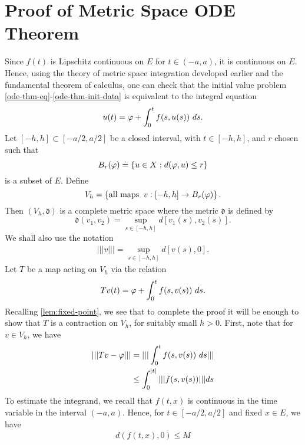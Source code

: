 \section{Proof of Metric Space ODE Theorem}
	Since $f(t)$ is Lipschitz continuous on $E$ for $t \in (-a, a)$, it is
	continuous on $E$. Hence, using the theory of metric space integration
  developed earlier and the fundamental theorem of calculus,
  one can check that the initial value problem
  \eqref{ode-thm-eq}-\eqref{ode-thm-init-data} is equivalent to the
	integral equation
	\begin{equation*}
		\begin{split}
			u(t) = \varphi + \int_0^t f(s, u(s) ) \ ds.
		\end{split}
	\end{equation*}
	Let $[-h, h] \subset [-a/2, a/2]$ be a closed interval, with $t \in [-h, h]$,
	and $r$ chosen such that
	$$B_r(\varphi) \doteq \left\{ u \in X: d(\varphi, u) \le r \right\}$$
	is a subset of $E$. Define 
	$$V_h = \left\{ \text{all maps} \; \;  v: [-h, h]
    \to B_r(\varphi)\right\}.$$ Then $(V_h, \mathfrak{d})$ is a complete metric space
    where the metric $\mathfrak{d}$ is defined by
    $$\mathfrak{d}(v_{1}, v_{2}) = \sup_{s \in [-h,
    h]} d[v_1(s),v_2(s)].$$ 
    We shall also use the notation
    \begin{equation*}
    \begin{split}
    ||| v ||| = \sup_{s \in [-h,
    h]} d[v(s),0]. 
    \end{split}
    \end{equation*}
    Let $T$ be a map
	acting on $V_h$ via the relation $$Tv(t) = \varphi + \int_0^t f(s, v(s) ) \ ds.$$
	Recalling \autoref{lem:fixed-point}, we see that to complete the proof it will be enough to show that $T$ is a contraction on
	$V_h$, for suitably small $h >0$. First, note that for $v \in V_h$, we have
\begin{equation}
	\label{cont-map-into}
	\begin{split}
		| | | Tv - \varphi| | |
		& = | | | \int_0^t f(s, v(s) ) \ ds | | |
		\\
    & \le  \int_0^{|t|} | | | f(s, v(s) ) | | | ds
    \end{split}
    \end{equation}
To estimate the integrand, we recall that $f(t, x)$ is continuous in the time
variable in the interval $(-a, a)$. Hence, for $t \in [-a/2, a/2]$ and fixed $x
\in E$, we have
%
%
\begin{equation*}
\begin{split}
d(f(t, x), 0) \le M
\end{split}
\end{equation*}
